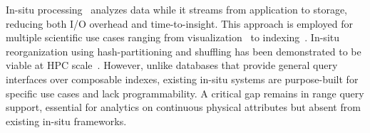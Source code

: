In-situ processing~\cite{Child2020:TerminologySituVisualization} analyzes data while it streams
from application to storage, reducing both I/O overhead and time-to-insight.
This approach is employed for multiple scientific use cases ranging from
visualization~\cite{Ayach2015:Catalyst,Ayach2016:SENSEI,Larse2017:ALPINE,Larse2022:Ascent} to
indexing~\cite{Eisen2025:ADIOS,Docan2010:DataSpaces}.
In-situ reorganization using hash-partitioning and shuffling has been demonstrated to be viable at
HPC scale~\cite{Zheng2018:DeltaFS}.
However, unlike databases that provide general query interfaces over composable indexes, existing
in-situ systems are purpose-built for specific use cases and lack programmability.
A critical gap remains in range query support, essential for analytics on continuous physical
attributes but absent from existing in-situ frameworks.






